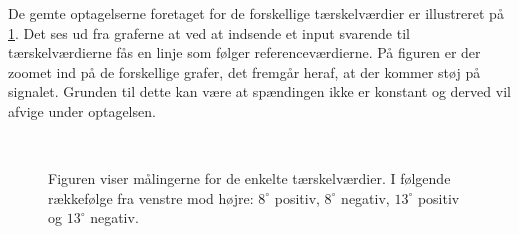 De gemte optagelserne foretaget for de forskellige tærskelværdier er illustreret på \ref{fig:software_grafer}. Det ses ud fra graferne at ved at indsende et input svarende til tærskelværdierne fås en linje som følger referenceværdierne. På figuren er der zoomet ind på de forskellige grafer, det fremgår heraf, at der kommer støj på signalet. Grunden til dette kan være at spændingen ikke er konstant og derved vil afvige under optagelsen. 
\begin{figure}[H]
\\[0.5cm]%
%
\caption{Figuren viser målingerne for de enkelte tærskelværdier. I følgende rækkefølge fra venstre mod højre: $8^{\circ}$ positiv, $8^{\circ}$ negativ, $13^{\circ}$ positiv og $13^{\circ}$ negativ.}
\label{fig:software_grafer}
\end{figure}

